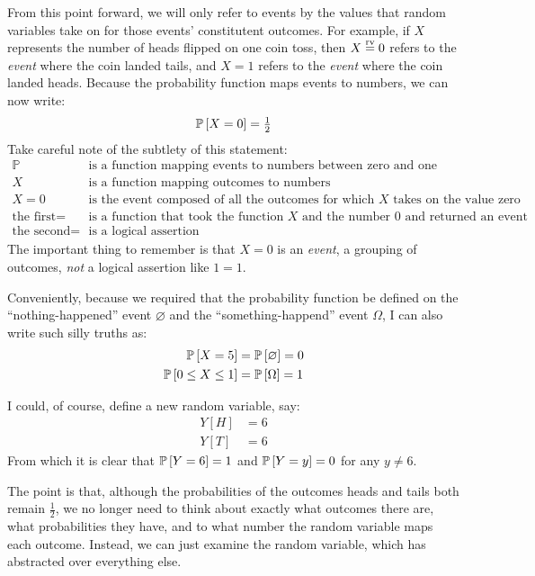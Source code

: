 From this point forward, we will only refer to events by the values that random
variables take on for those events' constitutent outcomes. For example, if
$X$ represents the number of heads flipped on one coin toss, then $X \stackrel{\text{rv}}{=} 0$
refers to the \emph{event} where the coin landed tails, and $X = 1$ refers to
the \emph{event} where the coin landed heads. Because the probability function
maps events to numbers, we can now write:
\begin{equation*}
  \mathbb{P}\left[{X = 0}\right] = \tfrac{1}{2}
\end{equation*}
Take careful note of the subtlety of this statement:
\begin{align*}
  \mathbb{P} &\text{ is a function mapping events to numbers between zero and one} \\
  X &\text{ is a function mapping outcomes to numbers} \\
  X = 0 &\text{ is the event composed of all the outcomes for which $X$ takes on the value zero} \\
  \text{the first} = &\text{ is a function that took the function $X$ and the number $0$ and returned an event} \\
  \text{the second} = &\text{ is a logical assertion}
\end{align*}
The important thing to remember is that $X = 0$ is an \emph{event}, a grouping
of outcomes, \emph{not} a logical assertion like $1=1$.

Conveniently, because we required that the probability function be defined on
the ``nothing-happened'' event $\varnothing$ and the ``something-happend''
event $\Omega$, I can also write such silly truths as:
\begin{align*}
  \mathbb{P}\left[{X = 5}\right] &= \mathbb{P}\left[{\varnothing}\right] = 0 \\
  \mathbb{P}\left[{0 \leq X \leq 1}\right] &= \mathbb{P}\left[{\Omega}\right] = 1
\end{align*}

I could, of course, define a new random variable, say:
\begin{align*}
  Y[H] &= 6 \\
  Y[T] &= 6
\end{align*}
From which it is clear that $\mathbb{P}\left[{Y = 6}\right] = 1$ and $\mathbb{P}\left[{Y = y}\right] = 0$ for any
$y \neq 6$.

The point is that, although the probabilities of the outcomes heads and tails
both remain $\tfrac{1}{2}$, we no longer need to think about exactly what
outcomes there are, what probabilities they have, and to what number the random
variable maps each outcome. Instead, we can just examine the random variable,
which has abstracted over everything else.

